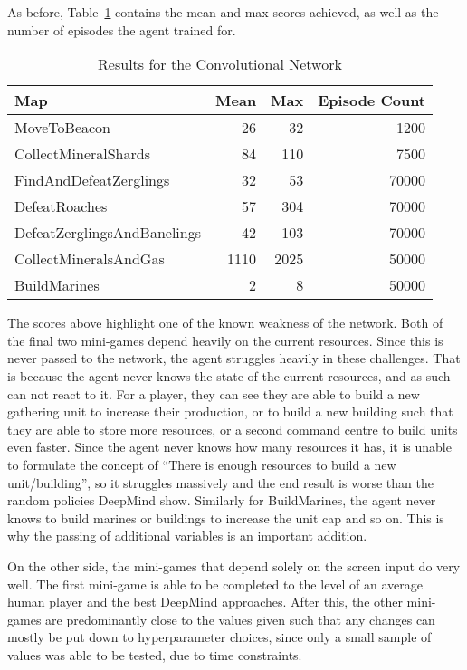 As before, Table~\ref{tab:cnn_results} contains the mean and max
scores achieved, as well as the number of episodes the agent trained for.

\begin{table}[h]
    \centering
    \begin{tabular}{@{}lrrr@{}}
        \toprule
        Map                         & Mean & Max  & Episode Count \\ \midrule
        MoveToBeacon                & 26   & 32   & 1200 \\
        CollectMineralShards        & 84   & 110  & 7500 \\
        FindAndDefeatZerglings      & 32   & 53   & 70000 \\
        DefeatRoaches               & 57   & 304  & 70000 \\
        DefeatZerglingsAndBanelings & 42   & 103  & 70000 \\
        CollectMineralsAndGas       & 1110 & 2025 & 50000 \\
        BuildMarines                & 2    & 8    & 50000 \\ \bottomrule
    \end{tabular}
    \caption{Results for the Convolutional Network}%
    \label{tab:cnn_results}%
\end{table}

The scores above highlight one of the known weakness of the network. Both of the
final two mini-games depend heavily on the current resources. Since this is
never passed to the network, the agent struggles heavily in these challenges.
That is because the agent never knows the state of the current resources, and as
such can not react to it. For a player, they can see they are able to build a
new gathering unit to increase their production, or to build a new building such
that they are able to store more resources, or a second command centre to build
units even faster. Since the agent never knows how many resources it has, it is
unable to formulate the concept of ``There is enough resources to build a new
unit/building'', so it struggles massively and the end result is worse than the
random policies DeepMind show. Similarly for BuildMarines, the agent never knows
to build marines or buildings to increase the unit cap and so on. This is why
the passing of additional variables is an important addition.

On the other side, the mini-games that depend solely on the screen input do very
well. The first mini-game is able to be completed to the level of an average
human player and the best DeepMind approaches. After this, the other mini-games
are predominantly close to the values given such that any changes can mostly be
put down to hyperparameter choices, since only a small sample of values was able
to be tested, due to time constraints.

